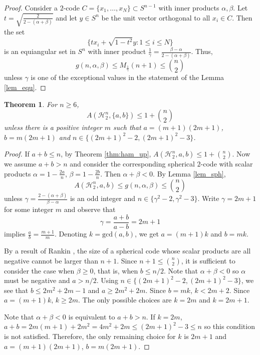 \documentclass{amsart}
\newtheorem{theoremenv}[definitionenv]{Theorem}
\newenvironment{theorem}{\begin{theoremenv}\rm}{\end{theoremenv}}
\newcommand{\cH}{\mathcal{H}}
\begin{document}
\begin{proof}
Consider a $2$-code $C = \{x_{1}, \dots, x_{N}\}\subset S^{n-1}$ with inner products $\alpha, \beta$. Let $t = \sqrt{\frac{2}{2-(\alpha+\beta)}}$ and let $y \in S^{n}$ be the unit vector orthogonal to all $x_{i} \in C$. Then the set
\begin{equation*}
    \{tx_{i} + \sqrt{1-t^{2}}y : 1 \leq i \leq N\}
\end{equation*}
is an equiangular set in $S^{n}$ with inner product $\frac{1}{\gamma} = \frac{\beta-\alpha}{2-(\alpha+\beta)}$. Thus, 
\begin{equation*}
    g(n, \alpha, \beta) \leq M_{\frac{1}{\gamma}}(n+1) \leq \binom{n}{2}
\end{equation*}
unless $\gamma$ is one of the exceptional values in the statement of the Lemma \ref{lem_equ}.
\end{proof}

\begin{theorem}
\label{thm:ham_partial_pro}
For $n\geq 6$,
\begin{equation*}
    A(\cH_{2}^{n}, \{a, b\}) \leq 1 + \binom{n}{2}
\end{equation*}
unless there is a positive integer $m$ such that $a = (m+1)(2m+1)$, $b = m(2m+1)$ and $n \in \{(2m+1)^{2}-2, (2m+1)^{2}-3\}$.
\end{theorem}

\begin{proof}
If $a + b \leq n$, by Theorem \ref{thm:ham_up}, $A(\cH_{2}^{n}, a, b) \leq 1 + \binom{n}{2}$. Now we assume $a + b > n$ and consider the corresponding spherical $2$-code with scalar products $\alpha = 1-\frac{2a}{n}$, $\beta = 1-\frac{2b}{n}$. Then $\alpha + \beta < 0$. By Lemma \ref{lem_sph},
\begin{equation*}
    A(\cH_{2}^{n}, a, b) \leq g(n, \alpha, \beta) \leq \binom{n}{2}
\end{equation*}
unless $\gamma = \frac{2-(\alpha+\beta)}{\beta - \alpha}$ is an odd integer and $n \in \{\gamma^{2}-2, \gamma^{2}-3\}$. Write $\gamma = 2m + 1$ for some integer $m$ and observe that
\begin{equation*}
    \gamma = \frac{a+b}{a-b} = 2m+1
\end{equation*}
implies $\frac{a}{b} = \frac{m+1}{m}$. Denoting $k=\text{gcd}(a,b)$, we get $a=(m+1)k$ and $b=mk$.

By a result of Rankin \cite{Ran55}, the size of a spherical code whose scalar products are all negative cannot be larger than $n+1$. Since $n+1\leq \binom{n}{2}$, it is sufficient to consider the case when $\beta\geq 0$, that is, when $b\leq n/2$. Note that $\alpha+\beta<0$ so $\alpha$ must be negative and $a>n/2$. Using $n \in \{(2m+1)^{2}-2, (2m+1)^{2}-3\}$, we see that $b\leq 2m^2+2m-1$ and $a\geq 2m^2+2m$. Since $b=mk$, $k< 2m+2$. Since $a=(m+1)k$, $k\geq 2m$. The only possible choices are $k=2m$ and $k=2m+1$.

Note that $\alpha+\beta<0$ is equivalent to $a+b>n$. If $k=2m$, $a+b=2m(m+1)+2m^2=4m^2+2m\leq (2m+1)^2-3\leq n$ so this condition is not satisfied. Therefore, the only remaining choice for $k$ is $2m+1$ and $a=(m+1)(2m+1)$, $b=m(2m+1)$.
\end{proof}
\end{document}
